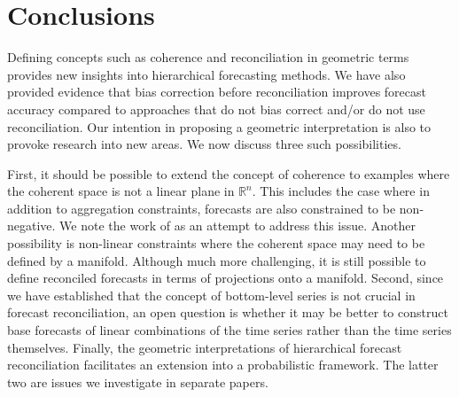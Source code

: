 \documentclass[12pt]{article}
\theoremstyle{definition}
\begin{document}
\section{Conclusions}\label{sec:conclusions}


Defining concepts such as coherence and reconciliation in geometric terms provides new insights into hierarchical forecasting methods. We have also provided evidence that bias correction before reconciliation improves forecast accuracy compared to approaches that do not bias correct and/or do not use reconciliation. Our intention in proposing a geometric interpretation is also to provoke research into new areas. We now discuss three such possibilities.

First, it should be possible to extend the concept of coherence {\color{blue}to examples where the coherent space is not a linear plane in $\mathbb{R}^n$.  This includes the case where in addition to aggregation constraints, forecasts are also constrained to be non-negative. We note the work of \cite{wickramasuriya2019optimal} as an attempt to address this issue.  Another possibility is} non-linear constraints where the coherent space may need to be defined by a manifold. Although much more challenging, it is still possible to define reconciled forecasts in terms of projections onto a manifold. Second, since we have established that the concept of bottom-level series is not crucial in forecast reconciliation, an open question is whether it may be better to construct base forecasts of linear combinations of the time series rather than the time series themselves. Finally, the geometric interpretations of hierarchical forecast reconciliation facilitates an extension into a probabilistic framework. The latter two are issues we investigate in separate papers.
\end{document}
